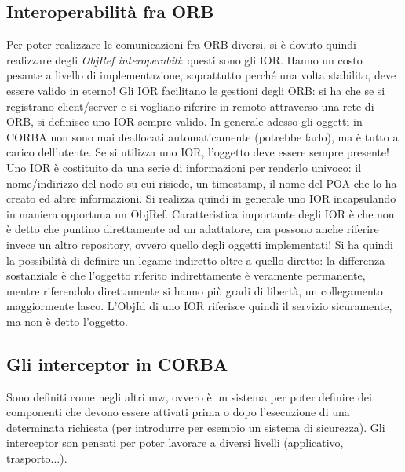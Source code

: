 \subsection{Interoperabilità fra ORB}
Per poter realizzare le comunicazioni fra ORB diversi, si è dovuto quindi realizzare degli \textit{ObjRef
interoperabili}: questi sono gli IOR. Hanno un costo pesante a livello di implementazione, soprattutto perché una volta
stabilito, deve essere valido in eterno!
Gli IOR facilitano le gestioni degli ORB: si ha che se si registrano client/server e si vogliano riferire in remoto
attraverso una rete di ORB, si definisce uno IOR sempre valido. In generale adesso gli oggetti in CORBA non sono mai
deallocati automaticamente (potrebbe farlo), ma è tutto a carico dell'utente. Se si utilizza uno IOR, l'oggetto deve
essere sempre presente!
Uno IOR è costituito da una serie di informazioni per renderlo univoco: il nome/indirizzo del nodo su cui risiede, un
timestamp, il nome del POA che lo ha creato ed altre informazioni. Si realizza quindi in generale uno IOR incapsulando
in maniera opportuna un ObjRef.
Caratteristica importante degli IOR è che non è detto che puntino direttamente ad un adattatore, ma possono anche
riferire invece un altro repository, ovvero quello degli oggetti implementati! Si ha quindi la possibilità di
definire un legame indiretto oltre a quello diretto: la differenza sostanziale è che l'oggetto riferito indirettamente è
veramente permanente, mentre riferendolo direttamente si hanno più gradi di libertà, un collegamento maggiormente
lasco. L'ObjId di uno IOR riferisce quindi il servizio sicuramente, ma non è detto l'oggetto.
\subsection{Gli interceptor in CORBA}
Sono definiti come negli altri mw, ovvero è un sistema per poter definire dei componenti che devono essere attivati
prima o dopo l'esecuzione di una determinata richiesta (per introdurre per esempio un sistema di sicurezza). Gli
interceptor son pensati per poter lavorare a diversi livelli (applicativo, trasporto...).
